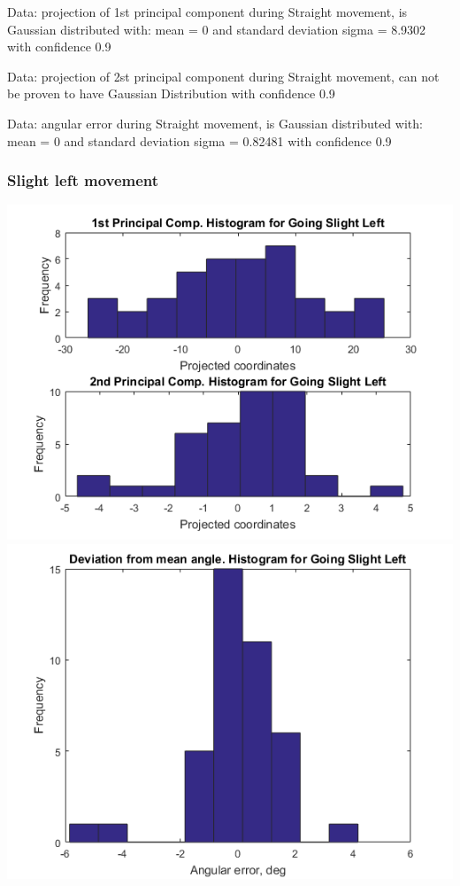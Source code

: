 \documentclass[a4paper, 12pt]{article}
\begin{document}
Data: projection of 1st principal component during  Straight movement, is Gaussian distributed with: mean = 0 and standard deviation sigma = 8.9302 with confidence 0.9%


\smallskip

Data:  projection of 2st principal component during  Straight movement, can not be proven to have Gaussian Distribution with confidence 0.9%


\smallskip


Data: angular error during   Straight movement, is Gaussian distributed with: mean = 0 and standard deviation sigma = 0.82481 with confidence 0.9%



\newpage
\subsubsection{Slight left movement}

\begin{center}
  \includegraphics[scale=0.6]{l2}
  \includegraphics[scale=0.6]{l3}
\end{center}
\end{document}
